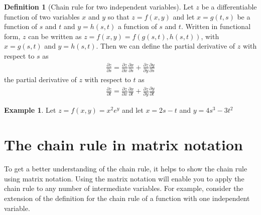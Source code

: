 \documentclass[
]{book}
\theoremstyle{definition}
\newtheorem{definition}{Definition}[chapter]
\theoremstyle{definition}
\newtheorem{example}{Example}[chapter]
\theoremstyle{definition}
\theoremstyle{definition}
\theoremstyle{remark}
\begin{document}
\begin{definition}[Chain rule for two independent variables]
Let \(z\) be a differentiable function of two variables \(x\) and \(y\) so that \(z = f(x, y)\) and let \(x=g(t, s)\) be a function of \(s\) and \(t\) and \(y=h(s, t)\) a function of \(s\) and \(t\). Written in functional form, \(z\) can be written as \(z = f(x, y) = f(g(s, t), h(s, t))\), with \(x=g(s, t)\) and \(y=h(s, t)\). Then we can define the partial derivative of \(z\) with respect to \(s\) as
\[
\begin{aligned}
\frac{\partial z}{\partial s} = \frac{\partial z}{ \partial x}\frac{\partial x}{\partial s} + \frac{\partial z}{\partial y}\frac{\partial y}{\partial s}
\end{aligned}
\]
the partial derivative of \(z\) with respect to \(t\) as
\[
\begin{aligned}
\frac{\partial z}{\partial t} = \frac{\partial z}{ \partial x}\frac{\partial x}{\partial t} + \frac{\partial z}{\partial y}\frac{\partial y}{\partial t}
\end{aligned}
\]
\end{definition}

\begin{example}
Let \(z = f(x, y) = x^2 e^y\) and let \(x = 2s - t\) and \(y = 4s^3-3t^2\)
\end{example}

\hypertarget{the-chain-rule-in-matrix-notation}{%
\section{The chain rule in matrix notation}\label{the-chain-rule-in-matrix-notation}}

To get a better understanding of the chain rule, it helps to show the chain rule using matrix notation. Using the matrix notation will enable you to apply the chain rule to any number of intermediate variables. For example, consider the extension of the definition for the chain rule of a function with one independent variable.
\end{document}
